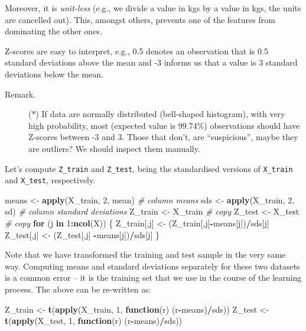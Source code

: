\documentclass[10pt,b5paper,krantz1]{krantz}
\newenvironment{Shaded}{\begin{snugshade}}{\end{snugshade}}
\newcommand{\CommentTok}[1]{\textcolor[rgb]{0.37,0.37,0.37}{\textit{#1}}}
\newcommand{\ControlFlowTok}[1]{\textcolor[rgb]{0.27,0.27,0.27}{\textbf{#1}}}
\newcommand{\DecValTok}[1]{\textcolor[rgb]{0.06,0.06,0.06}{#1}}
\newcommand{\KeywordTok}[1]{\textcolor[rgb]{0.27,0.27,0.27}{\textbf{#1}}}
\newcommand{\NormalTok}[1]{#1}
\newcommand{\OperatorTok}[1]{\textcolor[rgb]{0.43,0.43,0.43}{\textbf{#1}}}
\newcommand{\StringTok}[1]{\textcolor[rgb]{0.5,0.5,0.5}{#1}}
\begin{document}
Moreover, it is \emph{unit-less} (e.g., we divide a value in kgs by a value in kgs,
the units are cancelled out).
This, amongst others, prevents one of the features from dominating
the other ones.

Z-scores are easy to interpret, e.g., 0.5 denotes an observation
that is 0.5 standard deviations above the mean
and -3 informs us that a value is 3 standard deviations below the mean.

\begin{description}
\item[Remark.]
(*) If data are normally distributed (bell-shaped histogram),
with very high probability, most (expected value is 99.74\%) observations
should have Z-scores between -3 and 3. Those that don't, are
``suspicious'', maybe they are outliers? We should inspect them manually.
\end{description}

Let's compute \texttt{Z\_train} and \texttt{Z\_test},
being the standardised versions of \texttt{X\_train}
and \texttt{X\_test}, respectively.

\begin{Shaded}
\begin{Highlighting}[]
\NormalTok{means <-}\StringTok{ }\KeywordTok{apply}\NormalTok{(X_train, }\DecValTok{2}\NormalTok{, mean) }\CommentTok{# column means}
\NormalTok{sds   <-}\StringTok{ }\KeywordTok{apply}\NormalTok{(X_train, }\DecValTok{2}\NormalTok{, sd)   }\CommentTok{# column standard deviations}
\NormalTok{Z_train <-}\StringTok{ }\NormalTok{X_train }\CommentTok{# copy}
\NormalTok{Z_test  <-}\StringTok{ }\NormalTok{X_test  }\CommentTok{# copy}
\ControlFlowTok{for}\NormalTok{ (j }\ControlFlowTok{in} \DecValTok{1}\OperatorTok{:}\KeywordTok{ncol}\NormalTok{(X)) \{}
\NormalTok{    Z_train[,j] <-}\StringTok{ }\NormalTok{(Z_train[,j]}\OperatorTok{-}\NormalTok{means[j])}\OperatorTok{/}\NormalTok{sds[j]}
\NormalTok{    Z_test[,j]  <-}\StringTok{ }\NormalTok{(Z_test[,j] }\OperatorTok{-}\NormalTok{means[j])}\OperatorTok{/}\NormalTok{sds[j]}
\NormalTok{\}}
\end{Highlighting}
\end{Shaded}

Note that we have transformed the training and test sample in the very same
way. Computing means and standard deviations separately for these two datasets
is a common error -- it is the training set that we use in the course of the
learning process.
The above can be re-written as:

\begin{Shaded}
\begin{Highlighting}[]
\NormalTok{Z_train <-}\StringTok{ }\KeywordTok{t}\NormalTok{(}\KeywordTok{apply}\NormalTok{(X_train, }\DecValTok{1}\NormalTok{, }\ControlFlowTok{function}\NormalTok{(r) (r}\OperatorTok{-}\NormalTok{means)}\OperatorTok{/}\NormalTok{sds))}
\NormalTok{Z_test  <-}\StringTok{ }\KeywordTok{t}\NormalTok{(}\KeywordTok{apply}\NormalTok{(X_test,  }\DecValTok{1}\NormalTok{, }\ControlFlowTok{function}\NormalTok{(r) (r}\OperatorTok{-}\NormalTok{means)}\OperatorTok{/}\NormalTok{sds))}
\end{Highlighting}
\end{Shaded}
\end{document}
